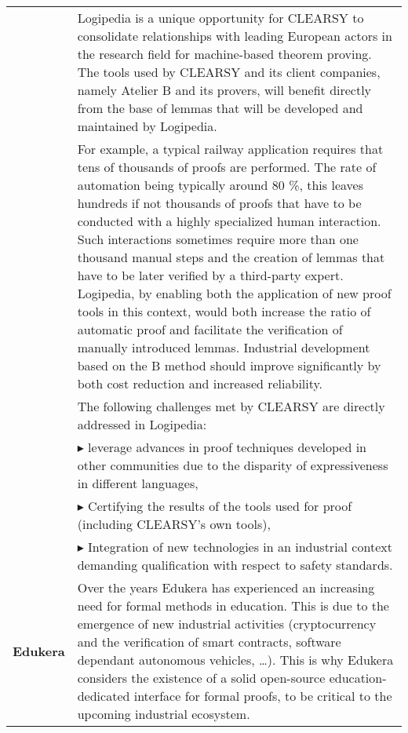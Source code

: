 \begin{longtable}{|p{}|p{}|}
&
\hspace{0.4cm}
Logipedia is a unique opportunity for CLEARSY to consolidate relationships with leading European actors in the research field for machine-based
theorem proving. The tools used by CLEARSY and its client companies, namely Atelier B and its provers, will benefit directly from the base of lemmas
that will be developed and maintained by Logipedia.
\\

&
\hspace{0.4cm}
For example, a typical railway application requires that tens of thousands of proofs are performed. The rate of automation being typically around 80 \%,
this leaves hundreds if not thousands of proofs that have to be conducted with a highly specialized human interaction. Such interactions sometimes require
more than one thousand manual steps and the creation of lemmas that have to be later verified by a third-party expert.
Logipedia, by enabling both the application of new proof tools in this context, would both increase the ratio of automatic proof and facilitate the verification
of manually introduced lemmas. Industrial development based on the B method should improve significantly by both cost reduction
and increased reliability.
\\

& The following challenges met by CLEARSY are
directly addressed in Logipedia:\\

& $\blacktriangleright$ leverage advances in proof techniques
developed in other communities due to the disparity of expressiveness
in different languages,\\

& $\blacktriangleright$ Certifying the results of the tools used for
proof (including CLEARSY's own tools),\\


&
$\blacktriangleright$
  Integration of new technologies in an industrial context demanding qualification with respect to safety standards.
\\

\hline

{\bf Edukera}&

\hspace{0.4cm} Over the years Edukera has experienced an increasing
need for formal methods in education. This is due to the emergence of
new industrial activities (cryptocurrency and the verification of
smart contracts, software dependant autonomous vehicles, \ldots). This
is why Edukera considers the existence of a solid open-source
education-dedicated interface for formal proofs, to be critical to the
upcoming industrial ecosystem.\\


\end{longtable}
